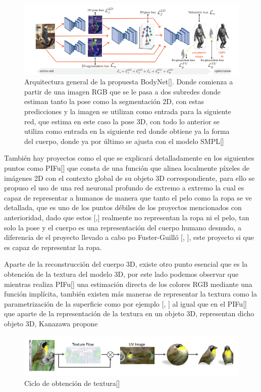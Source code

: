 \begin{figure}[!h]
	\centering
	\includegraphics[scale=0.6]{imagenes/estadoarte4.png}
	\caption{ Arquitectura general de la propuesta BodyNet[\cite{bodynet}]. Donde comienza a partir de una imagen RGB que se le pasa a dos subredes donde estiman tanto la pose como la segmentación 2D, con estas predicciones y la imagen se utilizan como  entrada para la siguiente red, que estima en este caso la pose 3D, con todo lo anterior se utiliza como entrada en la siguiente red donde obtiene ya la forma del cuerpo, donde ya por último se ajusta con el modelo SMPL[\cite{smpl}]}
	\label{fig:figura5}
\end{figure}

También hay proyectos como el que se explicará detalladamente en los siguientes puntos como PIFu[\cite{pifu}] que consta de una función que alinea localmente píxeles de imágenes 2D con el contexto global de su objeto 3D correspondiente, para ello se propuso el uso de una red neuronal profundo de extremo a extremo la cual es capaz de representar a humanos de manera que tanto el pelo como la ropa se ve detallada, que es uno de los puntos débiles de los proyectos mencionados con anterioridad, dado que estos [\cite{keepsmpl},\cite{pymaf}] realmente no representan la ropa ni el pelo, tan solo la pose y el cuerpo es una representación del cuerpo humano desnudo, a diferencia de el proyecto llevado a cabo po Fuster-Guilló [\cite{Andres1}, \cite{Nahuel1}], este proyecto si que es capaz de representar la ropa.

Aparte de la reconstrucción del cuerpo 3D, existe otro punto esencial que es la obtención de la textura del modelo 3D, por este lado podemos observar que mientras realiza PIFu[\cite{pifu}] una estimación directa de los colores RGB mediante una función implícita, también existen más maneras de representar la textura como la parametrización de la superficie como por ejemplo [\cite{texture1}, \cite{densepose}] al igual que en el PIFu[\cite{pifu}] que aparte de la representación de la textura en un objeto 3D, representan dicho objeto 3D, Kanazawa propone 
\begin{figure}[!h]
	\centering
	\includegraphics[scale=0.6]{imagenes/estadoarte5.png}
	\caption{Ciclo de obtención de textura[\cite{texture1}]}
	\label{fig:figura6}
\end{figure}

